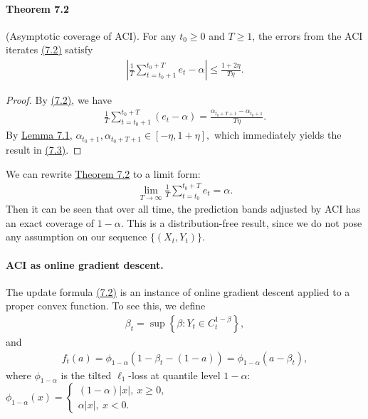 \documentclass{article}
\numberwithin{equation}{section}
\begin{document}
\paragraph{Theorem 7.2 \label{Theorem 7.2}} (Asymptotic coverage of ACI). For any $t_0\geq 0$ and $T\geq 1$,  the errors from the ACI iterates \hyperref[7.2]{(7.2)} satisfy
\begin{align*}
	\left\vert\frac{1}{T}\sum_{t=t_0+1}^{t_0+T}e_t - \alpha\right\vert \leq \frac{1+2\eta}{T\eta}.\tag{7.3}\label{7.3}
\end{align*}
\begin{proof}
By \hyperref[7.2]{(7.2)}, we have
\begin{align*}
	\frac{1}{T}\sum_{t=t_0+1}^{t_0+T}(e_t-\alpha) = \frac{\alpha_{t_0+T+1} - \alpha_{t_0+1}}{T\eta}.\tag{7.4}\label{7.4}
\end{align*}
By \hyperref[Lemma 7.1]{Lemma 7.1}, $\alpha_{t_0+1},\alpha_{t_0+T+1}\in [-\eta,1+\eta],$ which immediately yields the result in \hyperref[7.3]{(7.3)}.
\end{proof}

We can rewrite \hyperref[Theorem 7.2]{Theorem 7.2} to a limit form:
\begin{align*}
	\lim_{T\to\infty}\frac{1}{T}\sum_{t=t_0}^{t_0+T}e_t = \alpha.\tag{7.5}\label{7.5}
\end{align*}
Then it can be seen that over all time, the prediction bands adjusted by ACI has an exact coverage of $1-\alpha$. This is a distribution-free result, since we do not pose any assumption on our sequence $\{(X_t,Y_t)\}$.

\paragraph{ACI as online gradient descent.} The update formula \hyperref[7.2]{(7.2)} is an instance of online gradient descent applied to a proper convex function. To see this, we define
\begin{align*}
	\beta_t = \sup\left\{\beta:Y_t\in C_t^{1-\beta}\right\},\tag{7.6}\label{7.6}
\end{align*}
and
\begin{align*}
	f_t(a) = \phi_{1-\alpha}(1-\beta_t - (1-a)) = \phi_{1-\alpha}(a-\beta_t),\tag{7.7}\label{7.7}
\end{align*}
where $\phi_{1-\alpha}$ is the tilted $\ell_1$-loss at quantile level $1-\alpha$: $\phi_{1-\alpha}(x) = \begin{cases}(1-\alpha)\vert x\vert,\ x\geq 0,\\ \alpha\vert x\vert,\ x<0.\end{cases}$
\end{document}
